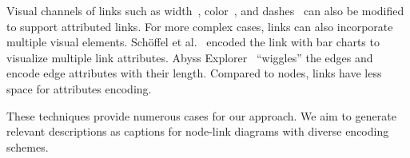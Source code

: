Visual channels of links such as width~\cite{Katz_2015}, color~\cite{DBLP:journals/tvcg/Guo09}, and dashes~\cite{DBLP:journals/bmcbi/JunkerKS06} can also be modified to support attributed links.
For more complex cases, links can also incorporate multiple visual elements.
Sch{\"{o}}ffel et al.~\cite{DBLP:conf/iv/SchoffelSE16} encoded the link with bar charts to visualize multiple link attributes.
Abyss Explorer~\cite{DBLP:journals/tvcg/NielsenJBJ09} ``wiggles'' the edges and encode edge attributes with their length.
Compared to nodes, links have less space for attributes encoding.

These techniques provide numerous cases for our approach.
We aim to generate relevant descriptions as captions for node-link diagrams with diverse encoding schemes.

